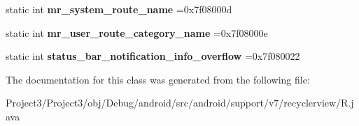 \begin{DoxyCompactItemize}
static int {\bfseries mr\+\_\+system\+\_\+route\+\_\+name} =0x7f08000d
\item 
\mbox{\label{classandroid_1_1support_1_1v7_1_1recyclerview_1_1R_1_1string_aa421481617f6193b387abea601fc50ca}} 
static int {\bfseries mr\+\_\+user\+\_\+route\+\_\+category\+\_\+name} =0x7f08000e
\item 
\mbox{\label{classandroid_1_1support_1_1v7_1_1recyclerview_1_1R_1_1string_a64dfafba6381c69fdd94228a9e52c619}} 
static int {\bfseries status\+\_\+bar\+\_\+notification\+\_\+info\+\_\+overflow} =0x7f080022
\end{DoxyCompactItemize}


The documentation for this class was generated from the following file\+:\begin{DoxyCompactItemize}
\item 
Project3/\+Project3/obj/\+Debug/android/src/android/support/v7/recyclerview/R.\+java\end{DoxyCompactItemize}
